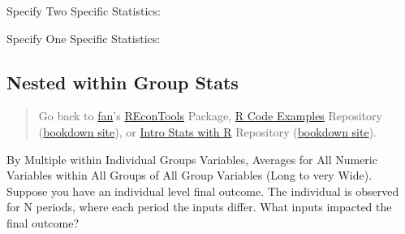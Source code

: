\documentclass[
]{book}
\newenvironment{Shaded}{\begin{snugshade}}{\end{snugshade}}
\newcommand{\DataTypeTok}[1]{\textcolor[rgb]{0.13,0.29,0.53}{#1}}
\newcommand{\KeywordTok}[1]{\textcolor[rgb]{0.13,0.29,0.53}{\textbf{#1}}}
\newcommand{\NormalTok}[1]{#1}
\newcommand{\OperatorTok}[1]{\textcolor[rgb]{0.81,0.36,0.00}{\textbf{#1}}}
\newcommand{\StringTok}[1]{\textcolor[rgb]{0.31,0.60,0.02}{#1}}
\begin{document}
Specify Two Specific Statistics:

\begin{Shaded}
\end{Shaded}

Specify One Specific Statistics:

\begin{Shaded}
\end{Shaded}

\hypertarget{nested-within-group-stats}{%
\subsection{Nested within Group Stats}\label{nested-within-group-stats}}

\begin{quote}
Go back to \href{http://fanwangecon.github.io/}{fan}'s \href{https://fanwangecon.github.io/REconTools/}{REconTools} Package, \href{https://fanwangecon.github.io/R4Econ/}{R Code Examples} Repository (\href{https://fanwangecon.github.io/R4Econ/bookdown}{bookdown site}), or \href{https://fanwangecon.github.io/Stat4Econ/}{Intro Stats with R} Repository (\href{https://fanwangecon.github.io/Stat4Econ/bookdown}{bookdown site}).
\end{quote}

By Multiple within Individual Groups Variables, Averages for All Numeric Variables within All Groups of All Group Variables (Long to very Wide). Suppose you have an individual level final outcome. The individual is observed for N periods, where each period the inputs differ. What inputs impacted the final outcome?
\end{document}
